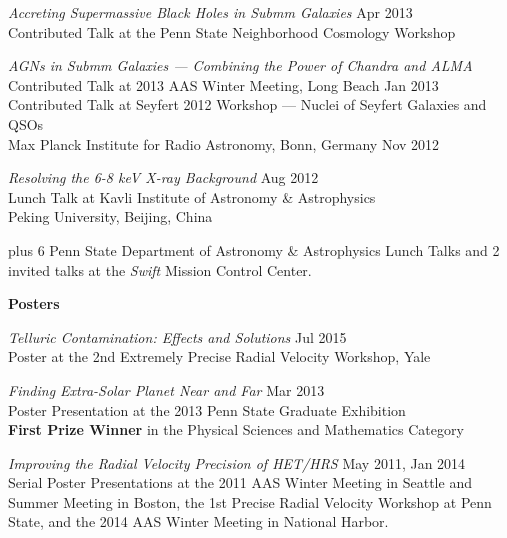 \begin{small}
\vspace{10pt}
{\sl Accreting Supermassive Black Holes in Submm Galaxies} \hfill   Apr 2013 \\
Contributed Talk at the Penn State Neighborhood Cosmology Workshop
% 

\vspace{10pt}
{\sl AGNs in Submm Galaxies --- Combining the Power of {\it Chandra}
  and ALMA}   \\
Contributed Talk at 2013 AAS Winter Meeting, Long Beach \hfill Jan
2013 \\
Contributed Talk at Seyfert 2012 Workshop --- Nuclei of Seyfert Galaxies and QSOs \\
Max Planck Institute for Radio Astronomy, Bonn, Germany \hfill Nov 2012

\vspace{10pt}
{\sl Resolving the 6-8 keV X-ray Background} \hfill   Aug 2012 \\
Lunch Talk at Kavli Institute of Astronomy \& Astrophysics \\
Peking University, Beijing, China
%

\vspace{10pt}
plus 6 Penn State Department of Astronomy \& Astrophysics Lunch Talks
and 2 invited talks at the {\it Swift} Mission Control Center.

\vspace{10pt}
{\bf Posters}

\vspace{10pt}
{\sl Telluric Contamination: Effects and Solutions} \hfill Jul 2015 \\
Poster at the 2nd Extremely Precise Radial Velocity Workshop, Yale

\vspace{10pt}
{\sl Finding Extra-Solar Planet Near and Far} \hfill   Mar 2013 \\
Poster Presentation at the 2013 Penn State Graduate Exhibition \\
{\bf First Prize Winner} in the Physical Sciences and Mathematics
Category
% 

\vspace{10pt}
{\sl Improving the Radial Velocity Precision of HET/HRS} \hfill
May 2011, Jan 2014 \\
Serial Poster Presentations at the 2011 AAS Winter Meeting in Seattle
and Summer Meeting in Boston, the 1st Precise Radial Velocity Workshop
at Penn State, and the 2014 AAS Winter Meeting in National
Harbor.
%


\end{small}
